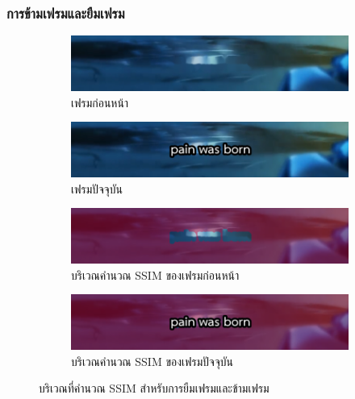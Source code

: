 \documentclass[xcolor=dvipsnames, xetex,serif]{beamer}
\numberwithin{equation}{section}
\begin{document}
    \begin{frame}
        \frametitle{การข้ามเฟรมและยืมเฟรม}
        \begin{figure}[H]
            \centering
            \begin{subfigure}{0.4\linewidth}
                \centering
                \includegraphics[width=0.95\linewidth]{images/skipborrow/prevframe.png}
                \caption{เฟรมก่อนหน้า}
                \label{image:ssim_location_prev}
            \end{subfigure}
            \begin{subfigure}{0.4\linewidth}
                \centering
                \includegraphics[width=0.95\linewidth]{images/skipborrow/currentframe.png}
                \caption{เฟรมปัจจุบัน}
                \label{image:ssim_location_curr}
            \end{subfigure}
            \bigskip
            \begin{subfigure}{0.4\linewidth}
                \centering
                \includegraphics[width=0.95\linewidth]{images/skipborrow/prevframeinverse.png}
                \caption{บริเวณคำนวณ SSIM ของเฟรมก่อนหน้า}
                \label{image:ssim_location_prev_inv}
            \end{subfigure}
            \begin{subfigure}{0.4\linewidth}
                \centering
                \includegraphics[width=0.95\linewidth]{images/skipborrow/currentframeinverse.png}
                \caption{บริเวณคำนวณ SSIM ของเฟรมปัจจุบัน}
                \label{image:ssim_location_curr_inv}
            \end{subfigure}
            \caption{บริเวณที่คำนวณ SSIM สำหรับการยืมเฟรมและข้ามเฟรม}
            \label{image:ssim_location}
        \end{figure}
    \end{frame}
\end{document}
